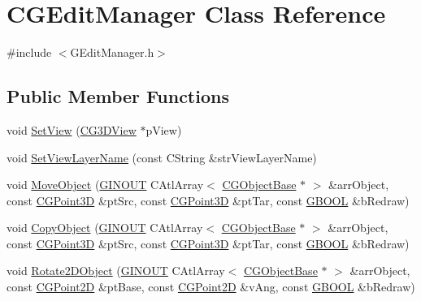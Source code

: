 \hypertarget{class_c_g_edit_manager}{}\section{C\+G\+Edit\+Manager Class Reference}
\label{class_c_g_edit_manager}


{\ttfamily \#include $<$G\+Edit\+Manager.\+h$>$}

\subsection*{Public Member Functions}
\begin{DoxyCompactItemize}
\item 
void \hyperlink{class_c_g_edit_manager_ab36eb713f21ca4af70f8b25f8880efac}{Set\+View} (\hyperlink{class_c_g3_d_view}{C\+G3\+D\+View} $\ast$p\+View)
\item 
void \hyperlink{class_c_g_edit_manager_a1fb3fa834ddde86d02e3db7b5d070ea3}{Set\+View\+Layer\+Name} (const C\+String \&str\+View\+Layer\+Name)
\item 
void \hyperlink{class_c_g_edit_manager_aa7233f7bd16ed1ebbf628acab3050aab}{Move\+Object} (\hyperlink{_g_types_8h_a3fc97b512f82d8e1a710da1235f9142a}{G\+I\+N\+O\+U\+T} C\+Atl\+Array$<$ \hyperlink{class_c_g_object_base}{C\+G\+Object\+Base} $\ast$ $>$ \&arr\+Object, const \hyperlink{class_c_g_point3_d}{C\+G\+Point3\+D} \&pt\+Src, const \hyperlink{class_c_g_point3_d}{C\+G\+Point3\+D} \&pt\+Tar, const \hyperlink{_g_types_8h_a2901915743626352a6820c5405f556dc}{G\+B\+O\+O\+L} \&b\+Redraw)
\item 
void \hyperlink{class_c_g_edit_manager_ae26f68d79609cb5779796a6432847a13}{Copy\+Object} (\hyperlink{_g_types_8h_a3fc97b512f82d8e1a710da1235f9142a}{G\+I\+N\+O\+U\+T} C\+Atl\+Array$<$ \hyperlink{class_c_g_object_base}{C\+G\+Object\+Base} $\ast$ $>$ \&arr\+Object, const \hyperlink{class_c_g_point3_d}{C\+G\+Point3\+D} \&pt\+Src, const \hyperlink{class_c_g_point3_d}{C\+G\+Point3\+D} \&pt\+Tar, const \hyperlink{_g_types_8h_a2901915743626352a6820c5405f556dc}{G\+B\+O\+O\+L} \&b\+Redraw)
\item 
void \hyperlink{class_c_g_edit_manager_a4efbe6e9114c0d7057018027d3332b9b}{Rotate2\+D\+Object} (\hyperlink{_g_types_8h_a3fc97b512f82d8e1a710da1235f9142a}{G\+I\+N\+O\+U\+T} C\+Atl\+Array$<$ \hyperlink{class_c_g_object_base}{C\+G\+Object\+Base} $\ast$ $>$ \&arr\+Object, const \hyperlink{class_c_g_point2_d}{C\+G\+Point2\+D} \&pt\+Base, const \hyperlink{class_c_g_point2_d}{C\+G\+Point2\+D} \&v\+Ang, const \hyperlink{_g_types_8h_a2901915743626352a6820c5405f556dc}{G\+B\+O\+O\+L} \&b\+Redraw)

\end{DoxyCompactItemize}
